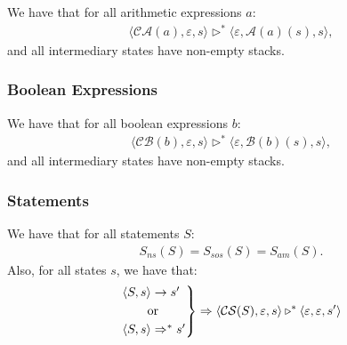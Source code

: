 We have that for all arithmetic expressions $a$: \begin{gather*}
  \langle \mathcal{CA}(a), \varepsilon, s \rangle 
  \triangleright^*
  \langle \varepsilon, \mathcal{A}(a)(s), s \rangle,
\end{gather*} and all intermediary states have non-empty stacks.

\subsubsection{Boolean Expressions}

We have that for all boolean expressions $b$: \begin{gather*}
  \langle \mathcal{CB}(b), \varepsilon, s \rangle 
  \triangleright^*
  \langle \varepsilon, \mathcal{B}(b)(s), s \rangle,
\end{gather*} and all intermediary states have non-empty stacks.

\subsubsection{Statements}

We have that for all statements $S$: \begin{gather*}
  S_{ns}(S) = S_{sos}(S) = S_{am}(S).
\end{gather*} Also, for all states $s$, we have that: \begin{gather*}
  \begin{rcases*}
    \langle S, s \rangle \to s' \\
    \qquad \text{or} \\
    \langle S, s \rangle \Rightarrow^* s'
  \end{rcases*} \Rightarrow
  \langle \mathcal{CS}(S), \varepsilon, s \rangle \triangleright^* 
  \langle \varepsilon, \varepsilon, s' \rangle 
\end{gather*}